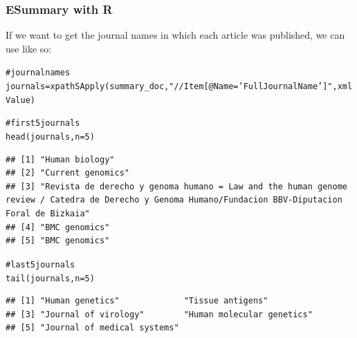 \documentclass{beamer}\usepackage[]{graphicx}\usepackage[]{color}
\makeatletter
\newcommand{\hlnum}[1]{\textcolor[rgb]{0.063,0.58,0.627}{#1}}%
\newcommand{\hlstr}[1]{\textcolor[rgb]{0.063,0.58,0.627}{#1}}%
\newcommand{\hlcom}[1]{\textcolor[rgb]{0.588,0.588,0.588}{#1}}%
\newcommand{\hlstd}[1]{\textcolor[rgb]{0.196,0.196,0.196}{#1}}%
\newcommand{\hlkwb}[1]{\textcolor[rgb]{0.627,0,0.314}{#1}}%
\newcommand{\hlkwc}[1]{\textcolor[rgb]{0,0.631,0.314}{#1}}%
\newcommand{\hlkwd}[1]{\textcolor[rgb]{0.78,0.227,0.412}{#1}}%
\newenvironment{kframe}{%
 \def\at@end@of@kframe{}%
 \ifinner\ifhmode%
  \def\at@end@of@kframe{\end{minipage}}%
  \begin{minipage}{\columnwidth}%
 \fi\fi%
 \def\FrameCommand##1{\hskip\@totalleftmargin \hskip-\fboxsep
 \colorbox{shadecolor}{##1}\hskip-\fboxsep
     \hskip-\linewidth \hskip-\@totalleftmargin \hskip\columnwidth}%
 \MakeFramed {\advance\hsize-\width
   \@totalleftmargin\z@ \linewidth\hsize
   \@setminipage}}%
 {\par\unskip\endMakeFramed%
 \at@end@of@kframe}
\newenvironment{knitrout}{}{} %
\makeatother
\begin{document}

\begin{frame}[fragile]
\frametitle{ESummary with R}
If we want to get the journal names in which each article was published, we can use  like so:



\begin{knitrout}\tiny
{}\color{fgcolor}\begin{kframe}
\begin{alltt}
\hlcom{# journal names}
\hlstd{journals} \hlkwb{=} \hlkwd{xpathSApply}\hlstd{(summary_doc,} \hlstr{"//Item[@Name='FullJournalName']"}\hlstd{, xmlValue)}

\hlcom{# first 5 journals}
\hlkwd{head}\hlstd{(journals,} \hlkwc{n} \hlstd{=} \hlnum{5}\hlstd{)}
\end{alltt}
\begin{verbatim}
## [1] "Human biology"                                                                                                                                      
## [2] "Current genomics"                                                                                                                                   
## [3] "Revista de derecho y genoma humano = Law and the human genome review / Catedra de Derecho y Genoma Humano/Fundacion BBV-Diputacion Foral de Bizkaia"
## [4] "BMC genomics"                                                                                                                                       
## [5] "BMC genomics"
\end{verbatim}
\begin{alltt}
\hlcom{# last 5 journals}
\hlkwd{tail}\hlstd{(journals,} \hlkwc{n} \hlstd{=} \hlnum{5}\hlstd{)}
\end{alltt}
\begin{verbatim}
## [1] "Human genetics"             "Tissue antigens"           
## [3] "Journal of virology"        "Human molecular genetics"  
## [5] "Journal of medical systems"
\end{verbatim}
\end{kframe}
\end{knitrout}

\end{frame}

\end{document}
